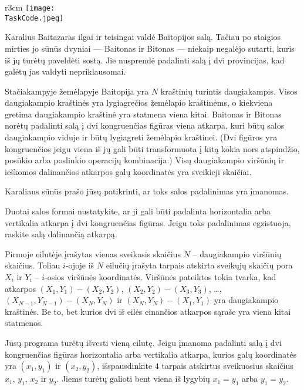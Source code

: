 \documentclass{boi2014-lt}
\renewcommand{\TaskCode}{demarcation}
\begin{document}
    \begin{wrapfigure}{r}{3cm}
        \vspace{-24pt}
		\texttt{[image: \\TaskCode.jpeg]}
	\end{wrapfigure}

    Karalius Baitazaras ilgai ir teisingai valdė Baitopijos salą. Tačiau po
    staigios mirties jo sūnūs dvyniai --- Baitonas ir Bitonas --- niekaip
    negalėjo sutarti, kuris iš jų turėtų paveldėti sostą. Jie nusprendė
    padalinti salą į dvi provincijas, kad galėtų jas valdyti nepriklausomai.
 
    Stačiakampyje žemėlapyje Baitopija yra $N$ kraštinių turintis daugiakampis.
    Visos daugiakampio kraštinės yra lygiagrečios žemėlapio kraštinėms, o
    kiekviena gretima daugiakampio kraštinė yra statmena viena kitai. Baitonas ir
    Bitonas norėtų padalinti salą į dvi kongruenčias figūras viena atkarpa, kuri
    būtų salos daugiakampio viduje ir būtų lygiagreti žemėlapio kraštinei. (Dvi
    figūros yra kongruenčios jeigu viena iš jų gali būti transformuota į kitą
    kokia nors atspindžio, posūkio arba poslinkio operacijų kombinacija.) Visų
    daugiakampio viršūnių ir ieškomos dalinančios atkarpos galų koordinatės yra
    sveikieji skaičiai.
 
    Karaliaus sūnūs prašo jūsų patikrinti, ar toks salos padalinimas yra
    įmanomas.

    \Task
    Duotai salos formai nustatykite, ar ji gali būti padalinta horizontalia arba
    vertikalia atkarpa į dvi kongruenčias figūras. Jeigu toks padalinimas
    egzistuoja, raskite salą dalinančią atkarpą.

    \Input
    Pirmoje eilutėje įrašytas vienas sveikasis skaičius $N$ -- daugiakampio
    viršūnių skaičius. Toliau $i$-ojoje iš $N$ eilučių įrašyta tarpais atskirta
    sveikųjų skaičių pora $X_i$ ir $Y_i$ -- $i$-osios viršūnės koordinatės.
    Viršūnės pateiktos tokia tvarka, kad atkarpos $(X_1,Y_1) - (X_2,Y_2)$,
    $(X_2,Y_2) - (X_3,Y_3)$, \ldots, $(X_{N-1},Y_{N-1}) - (X_N,Y_N)$ ir
    $(X_N,Y_N) - (X_1,Y_1)$ yra daugiakampio kraštinės. Be to, bet kurios dvi iš
    eilės einančios atkarpos sąraše yra viena kitai statmenos.

    \Output
    Jūsų programa turėtų išvesti vieną eilutę. Jeigu įmanoma padalinti salą į dvi
    kongruenčias figūras horizontalia arba vertikalia atkarpa, kurios galų
    koordinatės yra $(x_1, y_1)$ ir $(x_2, y_2)$, išspausdinkite $4$ tarpais
    atskirtus sveikuosius skaičius $x_1$, $y_1$, $x_2$ ir $y_2$. Jiems turėtų
    galioti bent viena iš lygybių $x_1 = y_1$ arba $y_1 = y_2$.
\end{document}
